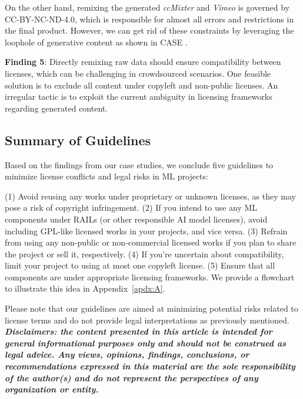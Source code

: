On the other hand, remixing the generated \textit{ccMixter} and \textit{Vimeo} is governed by CC-BY-NC-ND-4.0, which is responsible for almost all errors and restrictions in the final product.
However, we can get rid of these constraints by leveraging the loophole of generative content as shown in CASE .


\begin{tcolorbox}
\textbf{Finding 5}: Directly remixing raw data should ensure compatibility between licenses, which can be challenging in crowdsourced scenarios.
One feasible solution is to exclude all content under copyleft and non-public licenses. 
An irregular tactic is to exploit the current ambiguity in licensing frameworks regarding generated content.
\end{tcolorbox}

\subsection{Summary of Guidelines}

Based on the findings from our case studies, we conclude five guidelines to minimize license conflicts and legal risks in ML projects:

(1) Avoid reusing any works under proprietary or unknown licenses, as they may pose a risk of copyright infringement.
(2) If you intend to use any ML components under RAILs (or other responsible AI model licenses), avoid including GPL-like licensed works in your projects, and vice versa.
(3) Refrain from using any non-public or non-commercial licensed works if you plan to share the project or sell it, respectively. 
(4) If you're uncertain about compatibility, limit your project to using at most one copyleft license.
(5) Ensure that all components are under appropriate licensing frameworks.
We provide a flowchart to illustrate this idea in Appendix~\ref{apdx:A}.

Please note that our guidelines are aimed at minimizing potential risks related to license terms and do not provide legal interpretations as previously mentioned. 
\textit{\textbf{Disclaimers: the content presented in this article is intended for general informational purposes only and should not be construed as legal advice. Any views, opinions, findings, conclusions, or recommendations expressed in this material are the sole responsibility of the author(s) and do not represent the perspectives of any organization or entity.}}
